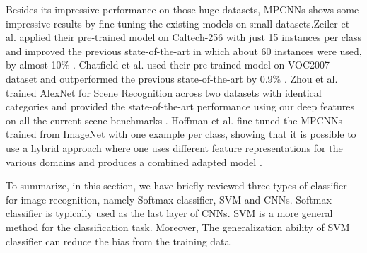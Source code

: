Besides its impressive performance on those huge datasets, MPCNNs shows some impressive results by fine-tuning the existing models on small datasets.Zeiler et al. applied their pre-trained model on Caltech-256 with just 15 instances per class and improved the previous state-of-the-art in which about 60 instances were used, by almost 10\% \cite{zeiler2014visualizing}. Chatfield et al. used their pre-trained model on VOC2007 dataset and outperformed the previous state-of-the-art by 0.9\% \cite{Chatfield14}. Zhou et al. trained AlexNet for Scene Recognition across two datasets with identical categories and provided the state-of-the-art performance using our deep features on all the current scene benchmarks \cite{NIPS2014_Zhou}. Hoffman et al. fine-tuned the MPCNNs trained from ImageNet with one example per class, showing that it is possible to use a hybrid approach where one uses different feature representations for the various domains
and produces a combined adapted model \cite{hoffman2013one}.

To summarize, in this section, we have briefly reviewed three types of classifier for image recognition, namely Softmax classifier, SVM and CNNs. Softmax classifier is typically used as the last layer of CNNs. SVM is a more general method for the classification task. Moreover, The generalization ability of SVM classifier can reduce the bias from the training data.
